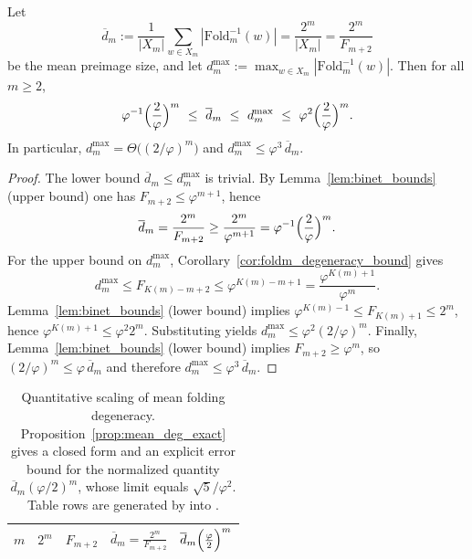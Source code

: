 \begin{corollary}
\label{cor:maxdeg_same_order_as_mean}
Let
\[
\overline{d}_m:=\frac{1}{|X_m|}\sum_{w\in X_m}|\mathrm{Fold}_m^{-1}(w)|=\frac{2^m}{|X_m|}=\frac{2^m}{F_{m+2}}
\]
be the mean preimage size, and let $d_m^{\max}:=\max_{w\in X_m}|\mathrm{Fold}_m^{-1}(w)|$.
Then for all $m\ge 2$,
\[
\varphi^{-1}\Bigl(\frac{2}{\varphi}\Bigr)^m\ \le\ \overline{d}_m\ \le\ d_m^{\max}\ \le\ \varphi^2\Bigl(\frac{2}{\varphi}\Bigr)^m.
\]
In particular, $d_m^{\max}=\Theta\!\bigl((2/\varphi)^m\bigr)$ and $d_m^{\max}\le \varphi^3\,\overline{d}_m$.
\end{corollary}

\begin{proof}
The lower bound $\overline{d}_m\le d_m^{\max}$ is trivial.
By Lemma~\ref{lem:binet_bounds} (upper bound) one has $F_{m+2}\le \varphi^{m+1}$, hence
\[
\overline{d}_m=\frac{2^m}{F_{m+2}}\ge \frac{2^m}{\varphi^{m+1}}=\varphi^{-1}\Bigl(\frac{2}{\varphi}\Bigr)^m.
\]
For the upper bound on $d_m^{\max}$, Corollary~\ref{cor:foldm_degeneracy_bound} gives
\[
d_m^{\max}\le F_{K(m)-m+2}\le \varphi^{K(m)-m+1}=\frac{\varphi^{K(m)+1}}{\varphi^{m}}.
\]
Lemma~\ref{lem:binet_bounds} (lower bound) implies $\varphi^{K(m)-1}\le F_{K(m)+1}\le 2^m$, hence $\varphi^{K(m)+1}\le \varphi^2 2^m$.
Substituting yields $d_m^{\max}\le \varphi^2 (2/\varphi)^m$.
Finally, Lemma~\ref{lem:binet_bounds} (lower bound) implies $F_{m+2}\ge \varphi^{m}$, so $(2/\varphi)^m\le \varphi\,\overline{d}_m$ and therefore $d_m^{\max}\le \varphi^3\,\overline{d}_m$.
\end{proof}

\begin{table}[H]
\centering
\small
\setlength{\tabcolsep}{6pt}
\renewcommand{\arraystretch}{1.12}
\begin{tabular}{rrrrr}
\toprule
$m$ & $2^m$ & $F_{m+2}$ & $\overline{d}_m=\frac{2^m}{F_{m+2}}$ & $\overline{d}_m\Bigl(\frac{\varphi}{2}\Bigr)^m$ \\
\midrule

\end{tabular}
\caption{Quantitative scaling of mean folding degeneracy. Proposition~\ref{prop:mean_deg_exact} gives a closed form and an explicit error bound for the normalized quantity $\overline{d}_m(\varphi/2)^m$, whose limit equals $\sqrt{5}/\varphi^2$. Table rows are generated by \protect{} into \protect{}.}
\label{tab:foldm_scaling}
\end{table}

